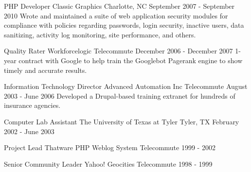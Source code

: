 \begin{cventries}

\cventry
{PHP Developer}
{Classic Graphics} %
{Charlotte, NC} %
{September 2007 - September 2010} %
{
Wrote and maintained a suite of web application security modules for compliance with policies regarding passwords, login security, inactive users, data sanitizing, activity log monitoring, site performance, and others.
}

\cventry
{Quality Rater}
{Workforcelogic}
{Telecommute}
{December 2006 - December 2007} %
{ %
1-year contract with Google to help train the Googlebot Pagerank engine to show timely and accurate results.
}


\cventry
{Information Technology Director}
{Advanced Automation Inc}
{Telecommute}
{August 2003 - June 2006} %
{ %
Developed a Drupal-based training extranet for hundreds of insurance agencies.
}


\cventry
{Computer Lab Assistant}
{The University of Texas at Tyler}
{Tyler, TX}
{February 2002 - June 2003} %


\cventry
{Project Lead}
{Thatware PHP Weblog System}
{Telecommute}
{1999 - 2002} %


\cventry
{Senior Community Leader}
{Yahoo! Geocities}
{Telecommute}
{1998 - 1999} %


\end{cventries}
